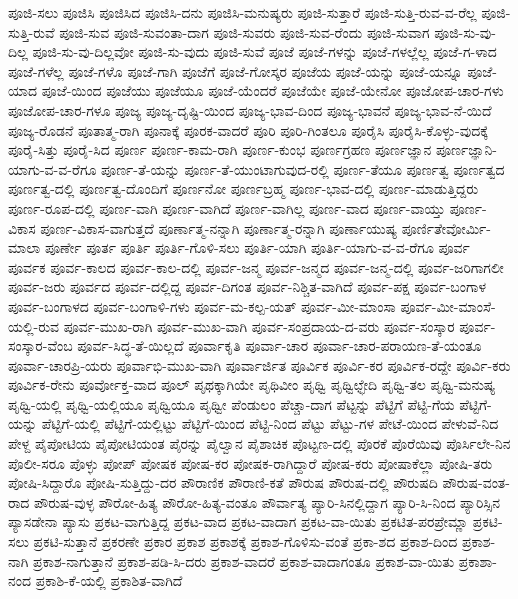 {ಪೂಜಿ-ಸಲು
ಪೂಜಿಸಿ
ಪೂಜಿಸಿದ
ಪೂಜಿಸಿ-ದನು
ಪೂಜಿಸಿ-ಮನುಷ್ಯರು
ಪೂಜಿ-ಸುತ್ತಾರೆ
ಪೂಜಿ-ಸುತ್ತಿ-ರುವ-ವ-ರೆಲ್ಲ
ಪೂಜಿ-ಸುತ್ತಿ-ರುವೆ
ಪೂಜಿ-ಸುವ
ಪೂಜಿ-ಸುವಂತಾ-ದಾಗ
ಪೂಜಿ-ಸುವರು
ಪೂಜಿ-ಸುವ-ರೆಂದು
ಪೂಜಿ-ಸುವಾಗ
ಪೂಜಿ-ಸು-ವು-ದಿಲ್ಲ
ಪೂಜಿ-ಸು-ವು-ದಿಲ್ಲವೋ
ಪೂಜಿ-ಸು-ವುದು
ಪೂಜಿ-ಸುವೆ
ಪೂಜೆ
ಪೂಜೆ-ಗಳನ್ನು
ಪೂಜೆ-ಗಳಲ್ಲೆಲ್ಲ
ಪೂಜೆ-ಗ-ಳಾದ
ಪೂಜೆ-ಗಳೆಲ್ಲ
ಪೂಜೆ-ಗಳೊ
ಪೂಜೆ-ಗಾಗಿ
ಪೂಜೆಗೆ
ಪೂಜೆ-ಗೋಸ್ಕರ
ಪೂಜೆಯ
ಪೂಜೆ-ಯನ್ನು
ಪೂಜೆ-ಯನ್ನೂ
ಪೂಜೆ-ಯಾದ
ಪೂಜೆ-ಯಿಂದ
ಪೂಜೆಯು
ಪೂಜೆಯೂ
ಪೂಜೆ-ಯೆಂದರೆ
ಪೂಜೆಯೇ
ಪೂಜೆ-ಯೇನೋ
ಪೂಜೋಪ-ಚಾರ-ಗಳು
ಪೂಜೋಪ-ಚಾರ-ಗಳೂ
ಪೂಜ್ಯ
ಪೂಜ್ಯ-ದೃಷ್ಟಿ-ಯಿಂದ
ಪೂಜ್ಯ-ಭಾವ-ದಿಂದ
ಪೂಜ್ಯ-ಭಾವನೆ
ಪೂಜ್ಯ-ಭಾವ-ನೆ-ಯಿದೆ
ಪೂಜ್ಯ-ರೊಡನೆ
ಪೂತಾತ್ಮ-ರಾಗಿ
ಪೂನಾಕ್ಕೆ
ಪೂರಕ-ವಾದರೆ
ಪೂರಿ
ಪೂರಿ-ಗಿಂತಲೂ
ಪೂರೈಸಿ
ಪೂರೈಸಿ-ಕೊಳ್ಳು-ವುದಕ್ಕೆ
ಪೂರೈ-ಸಿತ್ತು
ಪೂರೈ-ಸಿದ
ಪೂರ್ಣ
ಪೂರ್ಣ-ಕಾಮ-ರಾಗಿ
ಪೂರ್ಣ-ಕುಂಭ
ಪೂರ್ಣಗ್ರಹಣ
ಪೂರ್ಣಜ್ಞಾನ
ಪೂರ್ಣಜ್ಞಾನಿ-ಯಾಗು-ವ-ವ-ರೆಗೂ
ಪೂರ್ಣ-ತೆ-ಯನ್ನು
ಪೂರ್ಣ-ತೆ-ಯುಂಟಾಗುವುದ-ರಲ್ಲಿ
ಪೂರ್ಣ-ತೆಯೂ
ಪೂರ್ಣತ್ವ
ಪೂರ್ಣತ್ವದ
ಪೂರ್ಣತ್ವ-ದಲ್ಲಿ
ಪೂರ್ಣತ್ವ-ದೊಂದಿಗೆ
ಪೂರ್ಣನೋ
ಪೂರ್ಣಬ್ರಹ್ಮ
ಪೂರ್ಣ-ಭಾವ-ದಲ್ಲಿ
ಪೂರ್ಣ-ಮಾಡುತ್ತಿದ್ದರು
ಪೂರ್ಣ-ರೂಪ-ದಲ್ಲಿ
ಪೂರ್ಣ-ವಾಗಿ
ಪೂರ್ಣ-ವಾಗಿದೆ
ಪೂರ್ಣ-ವಾಗಿಲ್ಲ
ಪೂರ್ಣ-ವಾದ
ಪೂರ್ಣ-ವಾಯ್ತು
ಪೂರ್ಣ-ವಿಕಾಸ
ಪೂರ್ಣ-ವಿಕಾಸ-ವಾಗುತ್ತದೆ
ಪೂರ್ಣಾತ್ಮ-ನನ್ನಾಗಿ
ಪೂರ್ಣಾತ್ಮ-ರನ್ನಾಗಿ
ಪೂರ್ಣಾಯುಷ್ಯ
ಪೂರ್ಣಿತೇವೋರ್ಮಿ-ಮಾಲಾ
ಪೂರ್ಣೇ
ಪೂರ್ತ
ಪೂರ್ತಿ
ಪೂರ್ತಿ-ಗೊಳಿ-ಸಲು
ಪೂರ್ತಿ-ಯಾಗಿ
ಪೂರ್ತಿ-ಯಾಗು-ವ-ವ-ರೆಗೂ
ಪೂರ್ವ
ಪೂರ್ವಕ
ಪೂರ್ವ-ಕಾಲದ
ಪೂರ್ವ-ಕಾಲ-ದಲ್ಲಿ
ಪೂರ್ವ-ಜನ್ಮ
ಪೂರ್ವ-ಜನ್ಮದ
ಪೂರ್ವ-ಜನ್ಮ-ದಲ್ಲಿ
ಪೂರ್ವ-ಜರಿಗಾಗಲೀ
ಪೂರ್ವ-ಜರು
ಪೂರ್ವದ
ಪೂರ್ವ-ದಲ್ಲಿದ್ದ
ಪೂರ್ವ-ದಿಗಂತ
ಪೂರ್ವ-ನಿಶ್ಚಿತ-ವಾಗಿದೆ
ಪೂರ್ವ-ಪಕ್ಷ
ಪೂರ್ವ-ಬಂಗಾಳ
ಪೂರ್ವ-ಬಂಗಾಳದ
ಪೂರ್ವ-ಬಂಗಾಳಿ-ಗಳು
ಪೂರ್ವ-ಮ-ಕಲ್ಪ-ಯತ್
ಪೂರ್ವ-ಮೀ-ಮಾಂಸಾ
ಪೂರ್ವ-ಮೀ-ಮಾಂಸೆ-ಯಲ್ಲಿ-ರುವ
ಪೂರ್ವ-ಮುಖ-ರಾಗಿ
ಪೂರ್ವ-ಮುಖ-ವಾಗಿ
ಪೂರ್ವ-ಸಂಪ್ರದಾಯ-ದ-ವರು
ಪೂರ್ವ-ಸಂಸ್ಕಾರ
ಪೂರ್ವ-ಸಂಸ್ಕಾರ-ವೆಂಬ
ಪೂರ್ವ-ಸಿದ್ಧ-ತೆ-ಯಿಲ್ಲದೆ
ಪೂರ್ವಾಕೃತಿ
ಪೂರ್ವಾ-ಚಾರ
ಪೂರ್ವಾ-ಚಾರ-ಪರಾಯಣ-ತೆ-ಯಂತೂ
ಪೂರ್ವಾ-ಚಾರಪ್ರಿ-ಯರು
ಪೂರ್ವಾಭಿ-ಮುಖ-ವಾಗಿ
ಪೂರ್ವಾರ್ಜಿತ
ಪೂರ್ವಿಕ
ಪೂರ್ವಿ-ಕರ
ಪೂರ್ವಿಕ-ರದ್ದೇ
ಪೂರ್ವಿ-ಕರು
ಪೂರ್ವಿಕ-ರೇನು
ಪೂರ್ವೋಕ್ತ-ವಾದ
ಪೂಲ್
ಪೃಥಕ್ಕಾಗಿಯೇ
ಪೃಥಿವೀಂ
ಪೃಥ್ವಿ
ಪೃಥ್ವಿಛ್ಛೇದಿ
ಪೃಥ್ವಿ-ತಲ
ಪೃಥ್ವಿ-ಮನುಷ್ಯ
ಪೃಥ್ವಿ-ಯಲ್ಲಿ
ಪೃಥ್ವಿ-ಯಲ್ಲಿಯೂ
ಪೃಥ್ವಿಯೂ
ಪೃಥ್ವೀ
ಪೆಂಡುಲಂ
ಪೆಚ್ಚಾ-ದಾಗ
ಪೆಟ್ಟನ್ನು
ಪೆಟ್ಟಿಗೆ
ಪೆಟ್ಟಿ-ಗೆಯ
ಪೆಟ್ಟಿಗೆ-ಯನ್ನು
ಪೆಟ್ಟಿಗೆ-ಯಲ್ಲಿ
ಪೆಟ್ಟಿಗೆ-ಯಲ್ಲಿಟ್ಟು
ಪೆಟ್ಟಿಗೆ-ಯಿಂದ
ಪೆಟ್ಟಿ-ನಿಂದ
ಪೆಟ್ಟು
ಪೆಟ್ಟು-ಗಳ
ಪೇಟೆ-ಯಿಂದ
ಪೇಳುವೆ-ನಿದ
ಪೇಳ್ದ
ಪೈಪೋಟಿಯ
ಪೈಪೋಟಿಯಂತ
ಪೈರನ್ನು
ಪೈಲ್ವಾನ
ಪೈಶಾಚಿಕ
ಪೊಟ್ಟಣ-ದಲ್ಲಿ
ಪೊರಕೆ
ಪೊರೆಯಿವು
ಪೊರ್ಸಿಲೇ-ನಿನ
ಪೊಲೀ-ಸರೂ
ಪೊಳ್ಳು
ಪೋಪ್
ಪೋಷಕ
ಪೋಷ-ಕರ
ಪೋಷಕ-ರಾಗಿದ್ದಾರೆ
ಪೋಷ-ಕರು
ಪೋಷಾಕೆಲ್ಲಾ
ಪೋಷಿ-ತರು
ಪೋಷಿ-ಸಿದ್ದಾರೊ
ಪೋಷಿ-ಸುತ್ತಿದ್ದು-ದರ
ಪೌರಾಣಿಕ
ಪೌರಾಣಿ-ಕತೆ
ಪೌರುಷ
ಪೌರುಷ-ದಲ್ಲಿ
ಪೌರುಷದಿ
ಪೌರುಷ-ವಂತ-ರಾದ
ಪೌರುಷ-ವುಳ್ಳ
ಪೌರೋ-ಹಿತ್ಯ
ಪೌರೋ-ಹಿತ್ಯ-ವಂತೂ
ಪೌರ್ವಾತ್ಯ
ಪ್ಯಾರಿ-ಸಿನಲ್ಲಿದ್ದಾಗ
ಪ್ಯಾರಿ-ಸಿ-ನಿಂದ
ಪ್ಯಾರಿಸ್ಸಿನ
ಪ್ಯಾಸಡೇನಾ
ಪ್ಯಾಸು
ಪ್ರಕಟ-ವಾಗುತ್ತಿದ್ದ
ಪ್ರಕಟ-ವಾದ
ಪ್ರಕಟ-ವಾದಾಗ
ಪ್ರಕಟ-ವಾ-ಯಿತು
ಪ್ರಕಟಿತ-ಪರಪ್ರೇಮ್ಣಾ
ಪ್ರಕಟಿ-ಸಲು
ಪ್ರಕಟಿ-ಸುತ್ತಾನೆ
ಪ್ರಕರಣೇ
ಪ್ರಕಾರ
ಪ್ರಕಾಶ
ಪ್ರಕಾಶಕ್ಕೆ
ಪ್ರಕಾಶ-ಗೊಳಿಸು-ವಂತೆ
ಪ್ರಕಾ-ಶದ
ಪ್ರಕಾಶ-ದಿಂದ
ಪ್ರಕಾಶ-ನಾಗಿ
ಪ್ರಕಾಶ-ನಾಗುತ್ತಾನೆ
ಪ್ರಕಾಶ-ಪಡಿ-ಸಿ-ದರು
ಪ್ರಕಾಶ-ವಾದರೆ
ಪ್ರಕಾಶ-ವಾದಾಗಂತೂ
ಪ್ರಕಾಶ-ವಾ-ಯಿತು
ಪ್ರಕಾಶಾ-ನಂದ
ಪ್ರಕಾಶಿ-ಕೆ-ಯಲ್ಲಿ
ಪ್ರಕಾಶಿತ-ವಾಗಿದೆ
}
